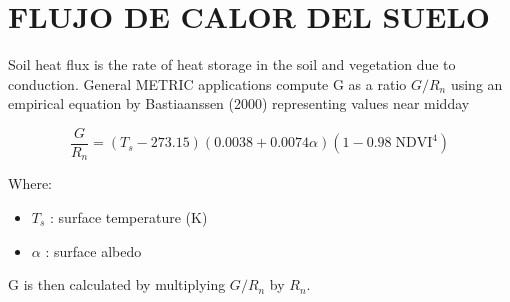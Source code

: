 \chapter{FLUJO DE CALOR DEL SUELO} %

Soil heat flux is the rate of heat storage in the soil and vegetation due to conduction. General METRIC applications compute G as a ratio $G/R_n$ using an empirical equation by Bastiaanssen (2000) representing values near midday

\begin{equation}
\frac{G}{R_n} = ( T_s - 273{.}15 ) (0{.}0038 + 0{.}0074 \alpha ) (1-0{.}98 \; \text{NDVI}^4) 
\label{eq:1}
\end{equation}

Where:
\begin{itemize}
    \item $T_s$ : surface temperature (K)
    \item $\alpha$ : surface albedo
\end{itemize}

G is then calculated by multiplying $G/R_n$ by $R_n$. 

